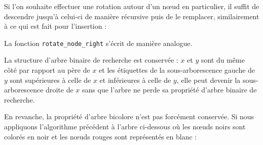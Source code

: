 Si l'on souhaite effectuer une rotation autour d'un nœud en particulier, il suffit de descendre jusqu'à celui-ci de manière récursive puis de le remplacer, similairement à ce qui est fait pour l'insertion :



La fonction \texttt{rotate\_node\_right} s'écrit de manière analogue.
\medskip

La structure d'arbre binaire de recherche est conservée : $x$ et $y$ sont du même côté par rapport au père de $x$ et les étiquettes de la sous-arborescence gauche de $y$ sont supérieures à celle de $x$ et inférieures à celle de $y$, elle peut devenir la sous-arborescence droite de $x$ sans que l'arbre ne perde sa propriété d'arbre binaire de recherche.
\medskip

En revanche, la propriété d'arbre bicolore n'est pas forcément conservée. Si nous appliquons l'algorithme précédent à l'arbre ci-dessous où les nœuds noirs sont colorés en noir et les nœuds rouges sont représentés en blanc :
\medskip

